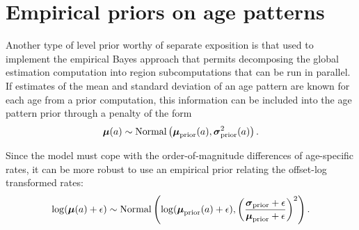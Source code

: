 \section{Empirical priors on age patterns}
Another type of level prior worthy of separate exposition is that used
to implement the empirical Bayes approach that permits decomposing the
global estimation computation into region subcomputations that can be
run in parallel.  If estimates of the mean and standard deviation of
an age pattern are known for each age from a prior computation, this
information can be included into the age pattern prior through a
penalty of the form
\[
\boldsymbol{\mu}(a) \sim \operatorname{Normal}\left(\boldsymbol{\mu}_{\text{prior}}(a),
\boldsymbol{\sigma}_{\text{prior}}^2(a)\right).
\]

Since the model must cope with the order-of-magnitude differences of age-specific rates, it can be more robust to use an empirical prior relating the offset-log transformed rates:
\[
\log(\boldsymbol{\mu}(a)+\epsilon) \sim \operatorname{Normal}\left(\log(\boldsymbol{\mu}_{\text{prior}}(a)+\epsilon),
\left(\frac{\boldsymbol{\sigma}_{\text{prior}}+\epsilon}{\boldsymbol{\mu}_{\text{prior}}+\epsilon}\right)^2\right).
\]

